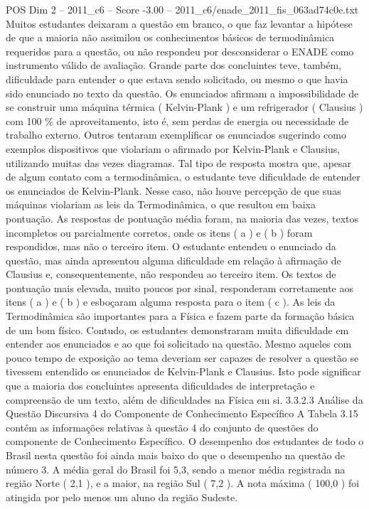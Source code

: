 \begin{textsample}{POS Dim 2 – 2011\_c6 – Score -3.00 – 2011\_c6/enade\_2011\_fis\_063ad74c0e.txt}
Muitos estudantes deixaram a questão em branco, o que faz levantar a hipótese de que a maioria não assimilou os conhecimentos básicos de termodinâmica requeridos para a questão, ou não respondeu por desconsiderar o ENADE como instrumento válido de avaliação.
Grande parte dos concluintes teve, também, dificuldade para entender o que estava sendo solicitado, ou mesmo o que havia sido enunciado no texto da questão.
Os enunciados afirmam a impossibilidade de se construir uma máquina térmica ( Kelvin-Plank ) e um refrigerador ( Clausius ) com 100 \% de aproveitamento, isto é, sem perdas de energia ou necessidade de trabalho externo.
Outros tentaram exemplificar os enunciados sugerindo como exemplos dispositivos que violariam o afirmado por Kelvin-Plank e Clausius, utilizando muitas das vezes diagramas.
Tal tipo de resposta mostra que, apesar de algum contato com a termodinâmica, o estudante teve dificuldade de entender os enunciados de Kelvin-Plank.
Nesse caso, não houve percepção de que suas máquinas violariam as leis da Termodinâmica, o que resultou em baixa pontuação.
As respostas de pontuação média foram, na maioria das vezes, textos incompletos ou parcialmente corretos, onde os itens ( a ) e ( b ) foram respondidos, mas não o terceiro item.
O estudante entendeu o enunciado da questão, mas ainda apresentou alguma dificuldade em relação à afirmação de Clausius e, consequentemente, não respondeu ao terceiro item.
Os textos de pontuação mais elevada, muito poucos por sinal, responderam corretamente aos itens ( a ) e ( b ) e esboçaram alguma resposta para o item ( c ).
As leis da Termodinâmica são importantes para a Física e fazem parte da formação básica de um bom físico.
Contudo, os estudantes demonstraram muita dificuldade em entender aos enunciados e ao que foi solicitado na questão.
Mesmo aqueles com pouco tempo de exposição ao tema deveriam ser capazes de resolver a questão se tivessem entendido os enunciados de Kelvin-Plank e Clausius.
Isto pode significar que a maioria dos concluintes apresenta dificuldades de interpretação e compreensão de um texto, além de dificuldades na Física em si. 3.3.2.3 Análise da Questão Discursiva 4 do Componente de Conhecimento Específico A Tabela 3.15 contém as informações relativas à questão 4 do conjunto de questões do componente de Conhecimento Específico.
O desempenho dos estudantes de todo o Brasil nesta questão foi ainda mais baixo do que o desempenho na questão de número 3.
A média geral do Brasil foi 5,3, sendo a menor média registrada na região Norte ( 2,1 ), e a maior, na região Sul ( 7,2 ).
A nota máxima ( 100,0 ) foi atingida por pelo menos um aluno da região Sudeste.

\end{textsample}
